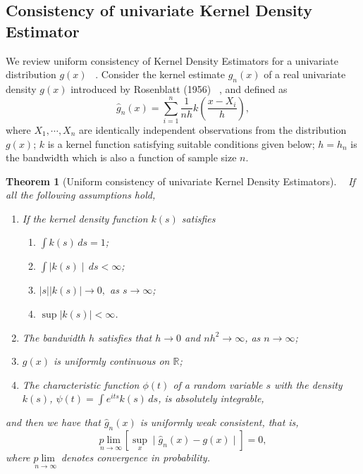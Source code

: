 \documentclass[12pt]{article}
\newtheorem{theorem}{Theorem}[section]
\begin{document}
\subsection{Consistency of univariate Kernel Density Estimator }
We review uniform consistency of Kernel Density Estimators for a univariate distribution $g(x)$ ~\cite{Silverman1978a,Pagan1999}. Consider the kernel estimate $\widehat{g}_n(x)$ of a real univariate density $g(x)$ introduced by Rosenblatt (1956) ~\cite{Silverman1978a,Pagan1999},  and defined as 
$$\widehat{g}_n(x) = \sum_{i=1}^{n} \frac{1}{nh} k\left( \frac{x-X_i}{h}\right),$$
where $X_1, \cdots, X_n$ are identically independent observations from the  distribution $g(x)$; $k$ is a kernel function satisfying suitable conditions given below; $h = h_n$ is the bandwidth which is also a function of sample size $n$.
\begin{theorem}[Uniform consistency of univariate Kernel Density Estimators]~\cite{Pagan1999,Silverman1978a}
	If all the following assumptions hold,
	\begin{enumerate}
		\item If the kernel density function $k(s)$ satisfies
		\begin{enumerate}
			\item $\int k(s)\,ds=1$;
			\item $\int \mid k(s) \mid \,ds<\infty$;
			\item $\left|s\right|\left|k(s)\right| \to 0,$ as $s \to \infty$;
			\item $\sup\left|k(s)\right|<\infty$.
		\end{enumerate}
		\item The bandwidth $h$ satisfies that $h \to 0$ and $nh^2 \to \infty$, as $n \to \infty$;
		\item $g(x)$ is uniformly continuous on $\mathbb{R}$;
		\item The characteristic function $\phi(t)$ of a random variable $s$ with the density $k(s)$,  $\psi(t) = \int e^{its} k(s)\,ds$, is absolutely integrable,
	\end{enumerate}
	and then we have that $\widehat{g}_n(x)$ is uniformly weak consistent, that is, 
	$$\underset{n \to \infty}{p\lim} \left[\underset{x}{\sup} \mid \widehat{g}_n(x) - g(x) \mid  \right] = 0,$$
	where $\underset{n \to \infty}{p\lim}$ denotes convergence in probability.
\end{theorem} 
\end{document}

